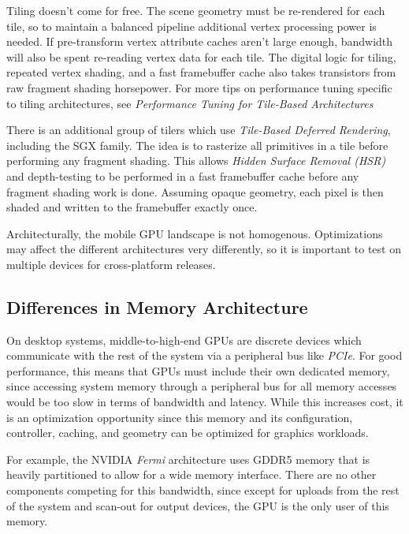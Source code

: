 Tiling doesn't come for free.  The scene geometry must be re-rendered for each
tile, so to maintain a balanced pipeline additional vertex processing power is
needed.  If pre-transform vertex attribute caches aren't large enough,
bandwidth will also be spent re-reading vertex data for each tile.  The digital
logic for tiling, repeated vertex shading, and a fast framebuffer cache also
takes transistors from raw fragment shading horsepower.  For more tips on
performance tuning specific to tiling architectures, see \textit{Performance
Tuning for Tile-Based Architectures} \cite{Chapter TODO}

 There is an additional group of tilers
which use \textit{Tile-Based Deferred Rendering}, including the SGX family.
The idea is to rasterize all primitives in a tile before performing any
fragment shading.  This allows \textit{Hidden Surface Removal (HSR)} and
depth-testing to be performed in a fast framebuffer cache before any fragment
shading work is done.  Assuming opaque geometry, each pixel is then shaded and
written to the framebuffer exactly once.

Architecturally, the mobile GPU landscape is not homogenous.  Optimizations may
affect the different architectures very differently, so it is important to test
on multiple devices for cross-platform releases.  \subsection{Differences in
Memory
Architecture}\label{Jon-McCaffrey:differences-in-memory-architecture}

On desktop systems, middle-to-high-end GPUs are discrete devices which
communicate with the rest of the system via a peripheral bus like
\textit{PCIe}.  For good performance, this means that GPUs must include their
own dedicated memory, since accessing system memory through a peripheral bus
for all memory accesses would be too slow in terms of bandwidth and latency.
While this increases cost, it is an optimization opportunity since this memory and 
its configuration, controller, caching, and geometry
can be optimized for graphics workloads.

For example, the NVIDIA \textit{Fermi} architecture uses GDDR5 memory that is
heavily partitioned \cite{Walton10} to allow for a wide memory interface.
There are no other components competing for this bandwidth, since except for
uploads from the rest of the system and scan-out for output devices, the GPU is
the only user of this memory.

